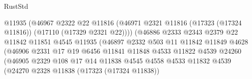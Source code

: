 \begin{lexlean}{RustStd}
\begin{coremodule}
                                      @11935
                                      (@46967
                                        @2322
                                        @22
                                        @11816
                                        (@46971
                                          @2321
                                          @11816
                                          (@17323 (@17324 @11816))
                                          (@17110 (@17329 @2321 @22))))
                                      (@46886
                                        @2333
                                        @2343
                                        @2379
                                        @22
                                        @11842
                                        @11851
                                        @4545
                                        @11935
                                        (@46897
                                          @2332
                                          @503
                                          @11
                                          @11842
                                          @11849
                                          @4628
                                          (@46906
                                            @2331
                                            @17
                                            @19
                                            @6456
                                            @11841
                                            @11848
                                            @4533
                                            @11822
                                            @4539
                                            @24260
                                            (@46905
                                              @2329
                                              @108
                                              @17
                                              @14
                                              @11838
                                              @4545
                                              @4558
                                              @4533
                                              @11832
                                              @4539
                                              (@24270
                                                @2328
                                                @11838
                                                (@17323 (@17324 @11838))

\end{coremodule}
\end{lexlean}
